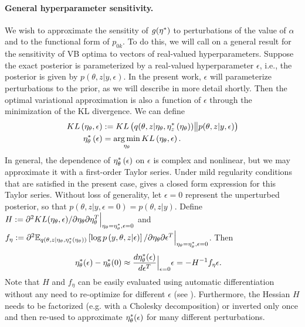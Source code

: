 
\paragraph{General hyperparameter sensitivity.}
%
We wish to approximate the sensitity of $g(\eta^{*})$ to perturbations of the
value of $\alpha$ and to the functional form of $p_{0k}$.  To do this, we will
call on a general result for the sensitivity of VB optima to vectors of
real-valued hyperparameters.  Suppose the exact posterior is parameterized by a
real-valued hyperparameter $\epsilon$, i.e., the posterior is given by
$p\left(\theta, z \vert y, \epsilon\right)$. In the present work, $\epsilon$
will parameterize perturbations to the prior, as we will describe in more detail
shortly.  Then the optimal variational approximation is also a function of
$\epsilon$ through the minimization of the KL divergence.  We can define
%
\begin{align}
KL\left(\eta_\theta, \epsilon\right) &:=
    KL\left(q(\theta, z \vert \eta_\theta, \eta_z^{*}\left(\eta_\theta\right))
    \big\| p(\theta, z | y, \epsilon) \right) \nonumber \\
\eta_\theta^{*}\left(\epsilon\right) &=
    \operatorname*{arg\,min}_{\eta_\theta} KL\left(\eta_\theta, \epsilon\right).
    \label{eq:pert_kl_objective}
\end{align}
%
In general, the dependence of $\eta_\theta^{*}\left(\epsilon\right)$ on $\epsilon$ is
complex and nonlinear, but we may approximate it with a first-order Taylor
series.
Under mild regularity conditions that are satisfied in the present case,
\citet[Theorem 2]{giordano:2017:covariances} gives a closed form
expression for this Taylor series.
Without loss of generality, let $\epsilon=0$ represent the unperturbed
posterior, so that $p\left(\theta, z \vert y, \epsilon=0\right) = p\left(\theta,
z \vert y \right)$.
Define
$H := \partial^2 KL(\eta_\theta, \epsilon) /
    \partial \eta_\theta \partial \eta_\theta^T
    \Big\rvert_{\eta_\theta = \eta_\theta^{*}, \epsilon = 0}$ and
$f_\eta := \partial^2
    \mathbb{E}_{q\left(\theta, z \vert \eta_\theta, \eta_z^{*}(\eta_\theta)\right)} \left[ \log p\left(y, \theta, z \vert \epsilon \right) \right]
    / \partial \eta_\theta \partial \epsilon^T
    \Big\rvert_{\eta_\theta = \eta_\theta^{*}, \epsilon = 0}$.
Then
%
\begin{align}
\eta_\theta^{*}(\epsilon)  -  \eta_\theta^{*}(0) &\approx
\frac{d \eta_\theta^{*}(\epsilon)}{d\epsilon^T}\Big|_{\epsilon=0} \epsilon =
- H^{-1} f_\eta \epsilon.
\label{eq:our_approximation}
\end{align}
%
Note that $H$ and $f_\eta$ can be easily evaluated using automatic
differentiation without any need to re-optimize for different $\epsilon$
\citep{maclaurin:2015:autograd} (see ).  Furthermore,
the Hessian $H$ needs to be factorized (e.g. with a Cholesky decomposition) or
inverted only once and then re-used to approximate $\eta_\theta^{*}(\epsilon)$ for
many different perturbations.

